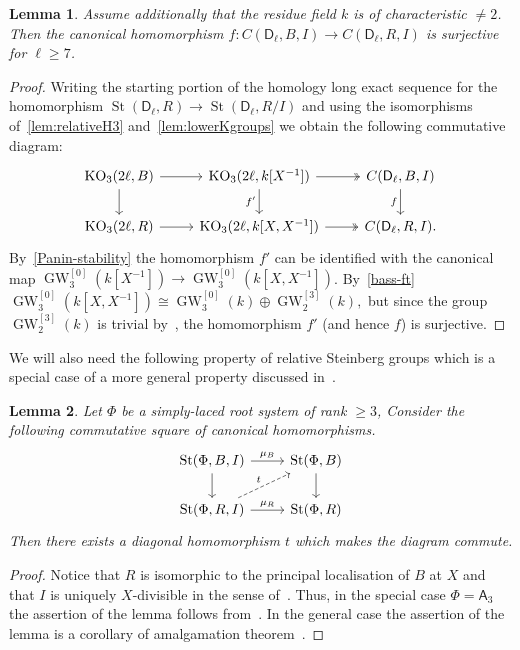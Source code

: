 \documentclass[oneside, 8pt]{amsart}
\newtheorem{lemma}{Lemma}
\theoremstyle{remark}
\theoremstyle{definition}
\numberwithin{lemma}{section}
\numberwithin{prop}{section}
\numberwithin{corollary}{section}
\numberwithin{externaltheorem}{section}
\DeclareMathOperator{\St}{St}
\DeclareMathOperator{\KO}{KO}
\DeclareMathOperator{\GW}{GW}
\newcommand{\rA}{\mathsf{A}}
\newcommand{\rD}{\mathsf{D}}
\numberwithin{equation}{section}
\begin{document}
\begin{lemma} \label{lem:prop41}
Assume additionally that the residue field $k$ is of characteristic $\neq 2$.
Then the canonical homomorphism $f\colon C(\rD_\ell, B, I) \to C(\rD_\ell, R, I)$ is surjective for $\ell \geq 7$. \end{lemma}
\begin{proof}
Writing the starting portion of the homology long exact sequence for the homomorphism $\St(\rD_\ell, R) \to \St(\rD_\ell, R/I)$ 
and using the isomorphisms of~\cref{lem:relativeH3} and~\cref{lem:lowerKgroups} we obtain the following commutative diagram:
\[\begin{tikzcd} \KO_3(2\ell, B) \arrow{r} \arrow{d} & \KO_3(2\ell, k[X^{-1}]) \arrow{d}[swap]{f'} \ar[r, twoheadrightarrow] & \ar{d}[swap]{f} C(\rD_\ell, B, I) \\
 \KO_3(2\ell, R) \arrow{r} & \KO_3(2\ell, k[X, X^{-1}]) \ar[r, twoheadrightarrow] & C(\rD_\ell, R, I). \end{tikzcd} \]
By~\cref{Panin-stability} the homomorphism $f'$ can be identified with the canonical map $\GW_3^{[0]}(k[X^{-1}]) \to \GW_3^{[0]}(k[X, X^{-1}])$.
By~\cref{bass-ft} $\GW_3^{[0]}(k[X, X^{-1}]) \cong \GW_3^{[0]}(k) \oplus \GW_2^{[3]}(k),$
but since the group $\GW_2^{[3]}(k)$ is trivial by~\cite[Lemma~2.2]{FRS12}, the homomorphism $f'$ (and hence $f$) is surjective.
\end{proof} 
 
We will also need the following property of relative Steinberg groups which is a special case of a more general property discussed in~\cite[\S~2]{LS17}.
\begin{lemma}\label{lem:lemma32} Let $\Phi$ be a simply-laced root system of rank $\geq 3$,
Consider the following commutative square of canonical homomorphisms.
\[\begin{tikzcd} \St(\Phi, B, I) \arrow{r}{\mu_B} \arrow{d} & \St(\Phi, B) \arrow{d} \\ \St(\Phi, R, I) \arrow{r}{\mu_R} \ar[ur, "t", dashrightarrow] & \St(\Phi, R) \end{tikzcd} \]
Then there exists a diagonal homomorphism $t$ which makes the diagram commute.   
\end{lemma} 
\begin{proof}
 Notice that $R$ is isomorphic to the principal localisation of $B$ at $X$
  and that $I$ is uniquely $X$-divisible in the sense of~\cite[\S~4]{LS17}.
 Thus, in the special case $\Phi = \rA_3$ the assertion of the lemma follows from~\cite[Theorem~3]{LS17}.
 In the general case the assertion of the lemma is a corollary of amalgamation theorem~\cite[Theorem~9]{S15}.
\end{proof}
\end{document}
